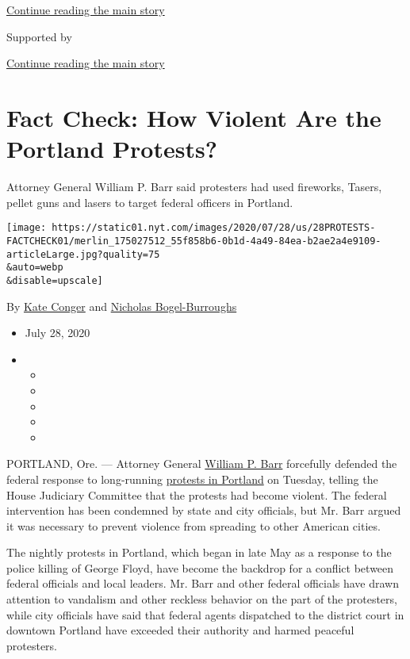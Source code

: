 \protect\hyperlink{after-top}{Continue reading the main story}

Supported by

\protect\hyperlink{after-sponsor}{Continue reading the main story}

\hypertarget{fact-check-how-violent-are-the-portland-protests}{%
\section{Fact Check: How Violent Are the Portland
Protests?}\label{fact-check-how-violent-are-the-portland-protests}}

Attorney General William P. Barr said protesters had used fireworks,
Tasers, pellet guns and lasers to target federal officers in Portland.

\texttt{[image: https://static01.nyt.com/images/2020/07/28/us/28PROTESTS-FACTCHECK01/merlin\_175027512\_55f858b6-0b1d-4a49-84ea-b2ae2a4e9109-articleLarge.jpg?quality=75\\\&auto=webp\\\&disable=upscale]}

By \href{https://www.nytimes.com/by/kate-conger}{Kate Conger} and
\href{https://www.nytimes.com/by/nicholas-bogel-burroughs}{Nicholas
Bogel-Burroughs}

\begin{itemize}
\item
  July 28, 2020
\item
  \begin{itemize}
  \item
  \item
  \item
  \item
  \item
  \end{itemize}
\end{itemize}

PORTLAND, Ore. --- Attorney General
\href{https://www.nytimes.com/2020/07/28/us/politics/barr-testimony.html}{William
P. Barr} forcefully defended the federal response to long-running
\href{https://www.nytimes.com/2020/07/29/us/protests-portland-federal-withdrawal.html}{protests
in Portland} on Tuesday, telling the House Judiciary Committee that the
protests had become violent. The federal intervention has been condemned
by state and city officials, but Mr. Barr argued it was necessary to
prevent violence from spreading to other American cities.

The nightly protests in Portland, which began in late May as a response
to the police killing of George Floyd, have become the backdrop for a
conflict between federal officials and local leaders. Mr. Barr and other
federal officials have drawn attention to vandalism and other reckless
behavior on the part of the protesters, while city officials have said
that federal agents dispatched to the district court in downtown
Portland have exceeded their authority and harmed peaceful protesters.

